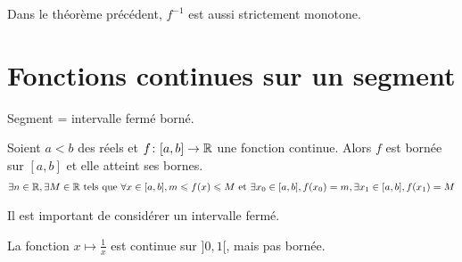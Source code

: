\begin{remarque}
Dans le théorème précédent, $f^{-1}$ est aussi strictement monotone.
\end{remarque}
\section{Fonctions continues sur un segment}
\begin{remarque}
Segment = intervalle fermé borné.
\end{remarque}
\begin{graybox}
\begin{theoreme}
Soient $a < b$ des réels et $f \colon [a, b] \to \mathbb{R}$ une fonction continue. Alors $f$ est bornée sur $[a, b]$ et elle atteint ses bornes.
\begin{align*}
\exists n \in \mathbb{R}, \exists M \in \mathbb{R} \text{ tels que } \forall x \in [a, b], m \leqslant f(x) \leqslant M \text{ et } \exists x_0 \in [a, b], f(x_0) = m, \exists x_1 \in [a, b], f(x_1) = M
\end{align*}
\end{theoreme}
\end{graybox}

\begin{remarque}
Il est important de considérer un intervalle fermé.
\end{remarque}

\begin{exemple}
La fonction $x \mapsto \frac{1}{x}$ est continue sur $]0, 1[$, mais pas bornée.
\end{exemple}